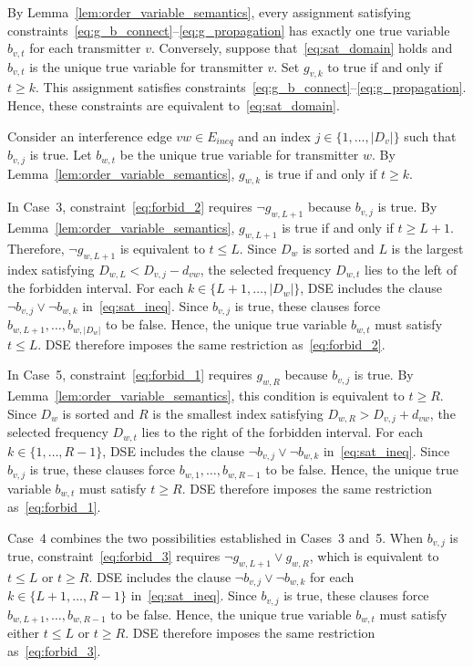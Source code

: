 \begin{IEEEproof}
By Lemma~\ref{lem:order_variable_semantics}, every assignment satisfying constraints~\eqref{eq:g_b_connect}--\eqref{eq:g_propagation} has exactly one true variable $b_{v,t}$ for each transmitter $v$. Conversely, suppose that~\eqref{eq:sat_domain} holds and $b_{v,t}$ is the unique true variable for transmitter $v$. Set $g_{v,k}$ to true if and only if $t\ge k$. This assignment satisfies constraints~\eqref{eq:g_b_connect}--\eqref{eq:g_propagation}. Hence, these constraints are equivalent to~\eqref{eq:sat_domain}.

Consider an interference edge $vw\in E_{ineq}$ and an index $j\in\{1,\ldots,|D_v|\}$ such that $b_{v,j}$ is true. Let $b_{w,t}$ be the unique true variable for transmitter $w$. By Lemma~\ref{lem:order_variable_semantics}, $g_{w,k}$ is true if and only if $t\ge k$.

In Case~3, constraint~\eqref{eq:forbid_2} requires $\neg g_{w,L+1}$ because $b_{v,j}$ is true. By Lemma~\ref{lem:order_variable_semantics}, $g_{w,L+1}$ is true if and only if $t\ge L+1$. Therefore, $\neg g_{w,L+1}$ is equivalent to $t\le L$. Since $D_w$ is sorted and $L$ is the largest index satisfying $D_{w,L}<D_{v,j}-d_{vw}$, the selected frequency $D_{w,t}$ lies to the left of the forbidden interval.
For each $k\in\{L+1,\ldots,|D_w|\}$, DSE includes the clause $\neg b_{v,j}\lor\neg b_{w,k}$ in~\eqref{eq:sat_ineq}. Since $b_{v,j}$ is true, these clauses force $b_{w,L+1},\ldots,b_{w,|D_w|}$ to be false. Hence, the unique true variable $b_{w,t}$ must satisfy $t\le L$. DSE therefore imposes the same restriction as~\eqref{eq:forbid_2}.

In Case~5, constraint~\eqref{eq:forbid_1} requires $g_{w,R}$ because $b_{v,j}$ is true. By Lemma~\ref{lem:order_variable_semantics}, this condition is equivalent to $t\ge R$. Since $D_w$ is sorted and $R$ is the smallest index satisfying $D_{w,R}>D_{v,j}+d_{vw}$, the selected frequency $D_{w,t}$ lies to the right of the forbidden interval.
For each $k\in\{1,\ldots,R-1\}$, DSE includes the clause $\neg b_{v,j}\lor\neg b_{w,k}$ in~\eqref{eq:sat_ineq}. Since $b_{v,j}$ is true, these clauses force $b_{w,1},\ldots,b_{w,R-1}$ to be false. Hence, the unique true variable $b_{w,t}$ must satisfy $t\ge R$. DSE therefore imposes the same restriction as~\eqref{eq:forbid_1}.

Case~4 combines the two possibilities established in Cases~3 and~5. When $b_{v,j}$ is true, constraint~\eqref{eq:forbid_3} requires $\neg g_{w,L+1}\lor g_{w,R}$, which is equivalent to $t\le L$ or $t\ge R$. DSE includes the clause $\neg b_{v,j}\lor\neg b_{w,k}$ for each $k\in\{L+1,\ldots,R-1\}$ in~\eqref{eq:sat_ineq}. Since $b_{v,j}$ is true, these clauses force $b_{w,L+1},\ldots,b_{w,R-1}$ to be false. Hence, the unique true variable $b_{w,t}$ must satisfy either $t\le L$ or $t\ge R$. DSE therefore imposes the same restriction as~\eqref{eq:forbid_3}.


\end{IEEEproof}
